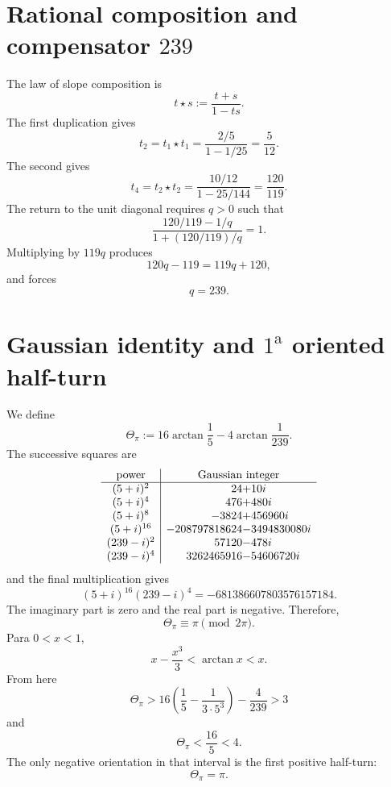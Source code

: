 \section{Rational composition and compensator \texorpdfstring{\(239\)}{239}}

The law of slope composition is
\[
 t\star s:=\frac{t+s}{1-ts}.
\]
The first duplication gives
\[
 t_2=t_1\star t_1
 =\frac{2/5}{1-1/25}
 =\frac5{12}.
\]
The second gives
\[
 t_4=t_2\star t_2
 =\frac{10/12}{1-25/144}
 =\frac{120}{119}.
\]
The return to the unit diagonal requires \(q>0\) such that
\[
 \frac{120/119-1/q}{1+(120/119)/q}=1.
\]
Multiplying by \(119q\) produces
\[
 120q-119=119q+120,
\]
and forces
\begin{equation}
 \boxed{q=239.}
 \label{gfp:b:eq:compensador-239-pi}
\end{equation}

\section{Gaussian identity and \(1^{\mathrm a}\) oriented half-turn}

We define
\begin{equation}
 \Theta_\pi
 :=16\arctan\frac15-4\arctan\frac1{239}.
 \label{gfp:b:eq:theta-pi-autonoma}
\end{equation}
The successive squares are
\[
\begin{array}{c|r@{}l}
\text{power}&\multicolumn{2}{c}{\text{Gaussian integer}}\\ \hline
(5+i)^2&24&+10i\\
(5+i)^4&476&+480i\\
(5+i)^8&-3824&+456960i\\
(5+i)^{16}&-208797818624&-3494830080i\\
(239-i)^2&57120&-478i\\
(239-i)^4&3262465916&-54606720i
\end{array}
\]
and the final multiplication gives
\begin{equation}
 \boxed{
 (5+i)^{16}(239-i)^4
 =-681386607803576157184.}
 \label{gfp:b:eq:identidad-gaussiana-pi-autonoma}
\end{equation}
The imaginary part is zero and the real part is negative. Therefore,
\[
 \Theta_\pi\equiv\pi\pmod{2\pi}.
\]
Para \(0<x<1\),
\[
 x-\frac{x^3}{3}<\arctan x<x.
\]
From here
\[
 \Theta_\pi>
 16\left(\frac15-\frac1{3\cdot5^3}\right)-\frac4{239}>3
\]
and
\[
 \Theta_\pi<\frac{16}{5}<4.
\]
The only negative orientation in that interval is the first positive half-turn:
\begin{equation}
 \boxed{\Theta_\pi=\pi.}
 \label{gfp:b:eq:reconocimiento-pi-exacto}
\end{equation}

